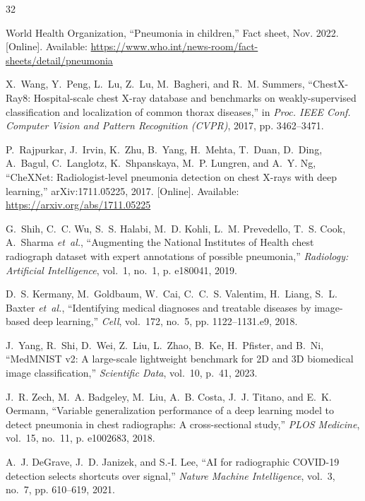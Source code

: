 \documentclass[conference]{IEEEtran}
\begin{document}
\begin{thebibliography}{32}

World Health Organization, ``Pneumonia in children,'' Fact sheet, Nov. 2022. [Online].
Available: \url{https://www.who.int/news-room/fact-sheets/detail/pneumonia}

X.~Wang, Y.~Peng, L.~Lu, Z.~Lu, M.~Bagheri, and R.~M. Summers, ``{ChestX-Ray8}:
Hospital-scale chest {X}-ray database and benchmarks on weakly-supervised classification and
localization of common thorax diseases,'' in \emph{Proc. IEEE Conf. Computer Vision and Pattern
Recognition (CVPR)}, 2017, pp. 3462--3471.

P.~Rajpurkar, J.~Irvin, K.~Zhu, B.~Yang, H.~Mehta, T.~Duan, D.~Ding, A.~Bagul, C.~Langlotz,
K.~Shpanskaya, M.~P. Lungren, and A.~Y. Ng, ``{CheXNet}: Radiologist-level pneumonia detection
on chest {X}-rays with deep learning,'' arXiv:1711.05225, 2017. [Online]. Available:
\url{https://arxiv.org/abs/1711.05225}

G.~Shih, C.~C. Wu, S.~S. Halabi, M.~D. Kohli, L.~M. Prevedello, T.~S. Cook, A.~Sharma
\emph{et~al.}, ``Augmenting the National Institutes of Health chest radiograph dataset with
expert annotations of possible pneumonia,'' \emph{Radiology: Artificial Intelligence}, vol.~1,
no.~1, p. e180041, 2019.

D.~S. Kermany, M.~Goldbaum, W.~Cai, C.~C.~S. Valentim, H.~Liang, S.~L. Baxter \emph{et~al.},
``Identifying medical diagnoses and treatable diseases by image-based deep learning,''
\emph{Cell}, vol.~172, no.~5, pp. 1122--1131.e9, 2018.

J.~Yang, R.~Shi, D.~Wei, Z.~Liu, L.~Zhao, B.~Ke, H.~Pfister, and B.~Ni, ``{MedMNIST} v2: A
large-scale lightweight benchmark for {2D} and {3D} biomedical image classification,''
\emph{Scientific Data}, vol.~10, p.~41, 2023.

J.~R. Zech, M.~A. Badgeley, M.~Liu, A.~B. Costa, J.~J. Titano, and E.~K. Oermann, ``Variable
generalization performance of a deep learning model to detect pneumonia in chest radiographs: A
cross-sectional study,'' \emph{PLOS Medicine}, vol.~15, no.~11, p. e1002683, 2018.

A.~J. DeGrave, J.~D. Janizek, and S.-I. Lee, ``{AI} for radiographic {COVID-19} detection selects
shortcuts over signal,'' \emph{Nature Machine Intelligence}, vol.~3, no.~7, pp. 610--619, 2021.


\end{thebibliography}
\end{document}
